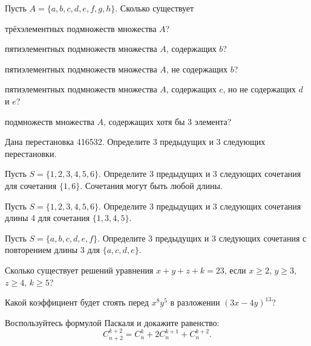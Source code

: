 \documentclass[a4paper,12pt,oneside]{article}
\begin{document}
\newpage
{}
Пусть $A=\{a,b,c,d,e,f,g,h\}$. Сколько существует
\begin{alphlist}
  \item трёхэлементных подмножеств множества $A$?
  \item пятиэлементных подмножеств множества $A$, содержащих $b$?
  \item пятиэлементных подмножеств множества $A$, не содержащих $b$?
  \item пятиэлементных подмножеств множества $A$, содержащих $c$, но не содержащих $d$ и $e$?
  \item подмножеств множества $A$, содержащих хотя бы 3 элемента?
\end{alphlist}

\begin{alphlist}
  \item Дана перестановка 416532. Определите 3 предыдущих и 3 следующих перестановки.
  \item Пусть $S=\{1,2,3,4,5,6\}$. Определите 3 предыдущих и 3 следующих сочетания для сочетания $\{1,6\}$. Сочетания могут быть любой длины.
  \item Пусть $S=\{1,2,3,4,5,6\}$. Определите 3 предыдущих и 3 следующих сочетания длины 4 для сочетания $\{1,3,4,5\}$.
  \item Пусть $S=\{a,b,c,d,e,f\}$. Определите 3 предыдущих и 3 следующих сочетания с повторением длины 3 для $\{a,c,d,e\}$.
\end{alphlist}

Сколько существует решений уравнения $x+y+z+k=23$, если $x\ge2$, $y\ge3$, $z\ge4$, $k\ge5$?

Какой коэффициент будет стоять перед $x^8y^5$ в разложении $(3x-4y)^{13}$?

Воспользуйтесь формулой Паскаля и докажите равенство:
\[
  C_{n+2}^{k+2}=C_n^k+2C_n^{k+1}+C_n^{k+2}.
\]
\end{document}
